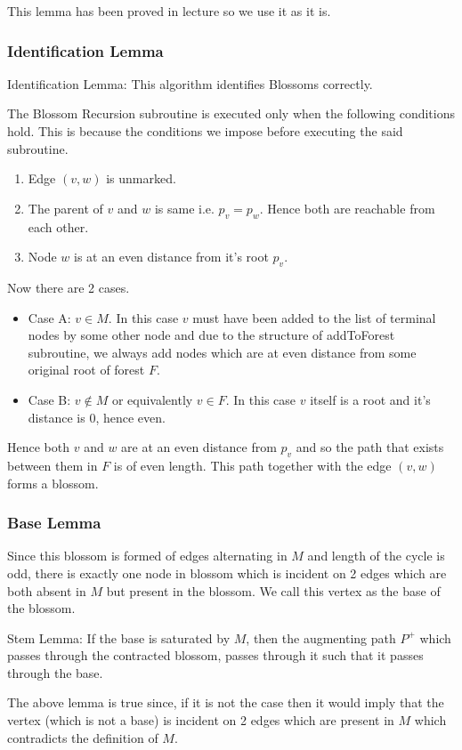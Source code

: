 \documentclass{article}
\begin{document}
This lemma has been proved in lecture so we use it as it is.

\subsubsection{Identification Lemma}
Identification Lemma: This algorithm identifies Blossoms correctly.

The Blossom Recursion subroutine is executed only when the following conditions hold. This is because the conditions we impose before executing the said subroutine.
\begin{enumerate}
    \item Edge $(v, w)$ is unmarked.
    \item The parent of $v$ and $w$ is same i.e. $p_v = p_w$. Hence both are reachable from each other.
    \item Node $w$ is at an even distance from it's root $p_v$.
\end{enumerate}
Now there are 2 cases.
\begin{itemize}
    \item Case A: $v \in M$. 
        In this case $v$ must have been added to the list of terminal nodes by some other node and due to the structure of addToForest subroutine, we always add nodes which are at even distance from some original root of forest $F$. 
    \item Case B: $v \notin M$ or equivalently $v \in F$.
        In this case $v$ itself is a root and it's distance is 0, hence even.
\end{itemize}
Hence both $v$ and $w$ are at an even distance from $p_v$ and so the path that exists between them in $F$ is of even length. This path together with the edge $(v, w)$ forms a blossom.

\subsubsection{Base Lemma}
Since this blossom is formed of edges alternating in $M$ and length of the cycle is odd, there is exactly one node in blossom which is incident on 2 edges which are both absent in $M$ but present in the blossom. We call this vertex as the base of the blossom.

Stem Lemma: If the base is saturated by $M$, then the augmenting path $P^+$ which passes through the contracted blossom, passes through it such that it passes through the base.

The above lemma is true since, if it is not the case then it would imply that the vertex (which is not a base) is incident on 2 edges which are present in $M$ which contradicts the definition of $M$.
\end{document}
